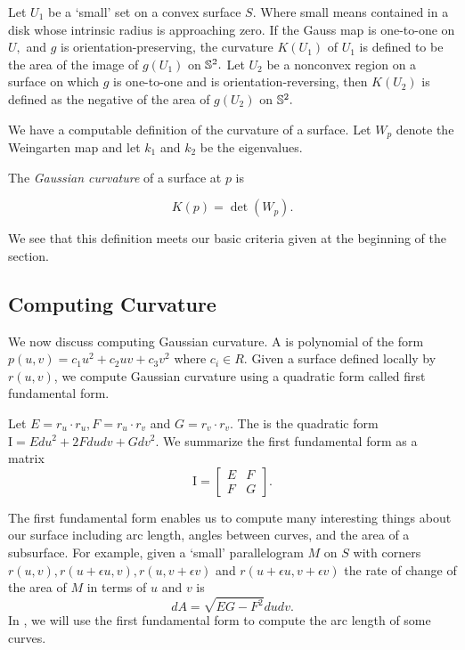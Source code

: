 Let $U_1$ be a `small' set on a convex surface $S$. Where small means
contained in a disk whose intrinsic radius is approaching zero.
If the Gauss map is one-to-one on $U,$ and $g$ is orientation-preserving,
the curvature $K(U_1)$ of $U_1$ is defined to be the area of the image of $g(U_1)$
on $\mathbb{S}^2.$
Let $U_2$ be a nonconvex region on a surface on which $g$ is one-to-one and is orientation-reversing,
then $K(U_2)$ is defined as the negative of the area of $g(U_2)$ on $\mathbb{S}^2.$



We have a computable definition of the curvature of a surface. Let $W_p$ denote
the Weingarten map and let $k_1$ and $k_2$ be the eigenvalues.
\begin{definition}
The \emph{Gaussian curvature} of a surface at \(p\) is

$$K(p)=\det(W_p).$$

\end{definition}
\noindent We see that this definition meets our basic criteria given at the beginning of the section.







\subsection{Computing Curvature}
We now discuss computing Gaussian curvature.
A  is polynomial 
of the form $p(u,v)=c_1u^2+c_2uv+c_3v^2$ 
where $c_i\in R$.
Given a surface defined locally by $r(u,v)$,
we compute Gaussian curvature using a quadratic form called first fundamental form.

Let $E=r_u\cdot r_u, F=r_u\cdot r_v$ and  $G=r_v\cdot r_v$.
The 
is the quadratic form $\mathrm{I}=Edu^2+2Fdudv +Gdv^2$.
We summarize the first fundamental form as a matrix $$\mathrm{I}=\begin{bmatrix}
E & F \\
F & G 
\end{bmatrix}.$$

The first fundamental form enables us to  compute many interesting
things about our surface including arc length, angles between curves,
and the area of a subsurface.
For example,
given a `small' parallelogram $M$ on $S$ with corners $r(u,v),r(u+\epsilon u, v), r(u,v+\epsilon v)$ 
and $r(u+\epsilon u, v+\epsilon v)$ the rate of change of the area of $M$ in terms of $u$ and $v$ is 
$$dA=\sqrt{EG-F^2}dudv.$$
In , we will use the first fundamental form to compute the arc length of some curves.

